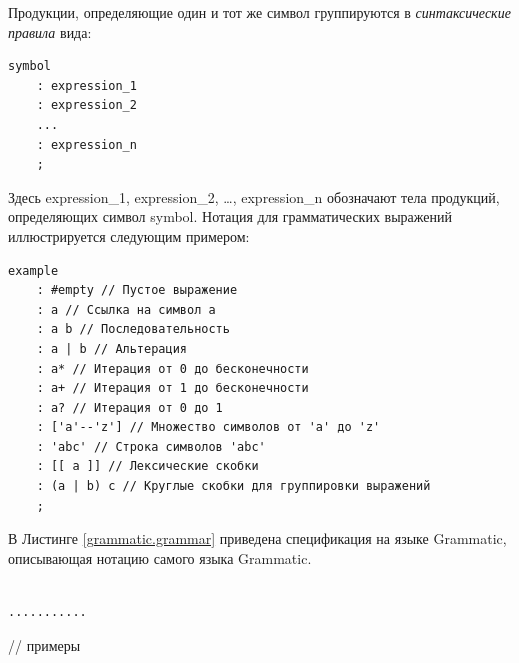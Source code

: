 Продукции, определяющие один и тот же символ группируются в \emph{синтаксические правила} вида:

\begin{lstlisting}
symbol
	: expression_1
	: expression_2
	...
	: expression_n
	;
\end{lstlisting}

Здесь expression_1, expression_2, \ldots, expression_n обозначают тела продукций, определяющих символ symbol. Нотация для грамматических выражений иллюстрируется следующим примером:
\begin{lstlisting}
example
	: #empty // Пустое выражение
	: a // Ссылка на символ a
	: a b // Последовательность 
	: a | b // Альтерация
	: a* // Итерация от 0 до бесконечности
	: a+ // Итерация от 1 до бесконечности
	: a? // Итерация от 0 до 1
	: ['a'--'z'] // Множество символов от 'a' до 'z'
	: 'abc' // Строка символов 'abc'
	: [[ a ]] // Лексические скобки
	: (a | b) c // Круглые скобки для группировки выражений
	;
\end{lstlisting}

В Листинге \ref{grammatic.grammar} приведена спецификация на языке Grammatic, описывающая нотацию самого языка Grammatic.

\begin{lstlisting}

...........

\end{lstlisting}

// примеры


